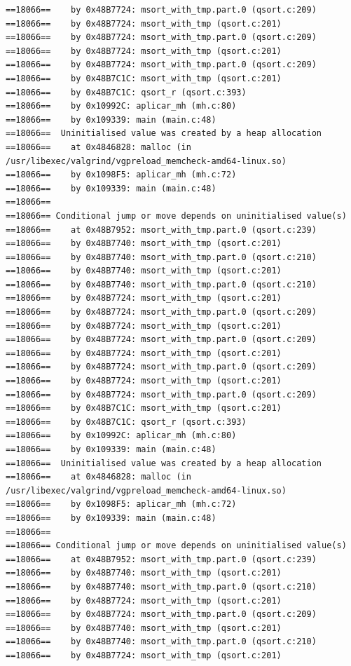 \documentclass[12pt]{article}
\begin{document}
\begin{lstlisting}[style=EstiloValgrind]
==18066==    by 0x48B7724: msort_with_tmp.part.0 (qsort.c:209)
==18066==    by 0x48B7724: msort_with_tmp (qsort.c:201)
==18066==    by 0x48B7724: msort_with_tmp.part.0 (qsort.c:209)
==18066==    by 0x48B7724: msort_with_tmp (qsort.c:201)
==18066==    by 0x48B7724: msort_with_tmp.part.0 (qsort.c:209)
==18066==    by 0x48B7C1C: msort_with_tmp (qsort.c:201)
==18066==    by 0x48B7C1C: qsort_r (qsort.c:393)
==18066==    by 0x10992C: aplicar_mh (mh.c:80)
==18066==    by 0x109339: main (main.c:48)
==18066==  Uninitialised value was created by a heap allocation
==18066==    at 0x4846828: malloc (in /usr/libexec/valgrind/vgpreload_memcheck-amd64-linux.so)
==18066==    by 0x1098F5: aplicar_mh (mh.c:72)
==18066==    by 0x109339: main (main.c:48)
==18066== 
==18066== Conditional jump or move depends on uninitialised value(s)
==18066==    at 0x48B7952: msort_with_tmp.part.0 (qsort.c:239)
==18066==    by 0x48B7740: msort_with_tmp (qsort.c:201)
==18066==    by 0x48B7740: msort_with_tmp.part.0 (qsort.c:210)
==18066==    by 0x48B7740: msort_with_tmp (qsort.c:201)
==18066==    by 0x48B7740: msort_with_tmp.part.0 (qsort.c:210)
==18066==    by 0x48B7724: msort_with_tmp (qsort.c:201)
==18066==    by 0x48B7724: msort_with_tmp.part.0 (qsort.c:209)
==18066==    by 0x48B7724: msort_with_tmp (qsort.c:201)
==18066==    by 0x48B7724: msort_with_tmp.part.0 (qsort.c:209)
==18066==    by 0x48B7724: msort_with_tmp (qsort.c:201)
==18066==    by 0x48B7724: msort_with_tmp.part.0 (qsort.c:209)
==18066==    by 0x48B7724: msort_with_tmp (qsort.c:201)
==18066==    by 0x48B7724: msort_with_tmp.part.0 (qsort.c:209)
==18066==    by 0x48B7C1C: msort_with_tmp (qsort.c:201)
==18066==    by 0x48B7C1C: qsort_r (qsort.c:393)
==18066==    by 0x10992C: aplicar_mh (mh.c:80)
==18066==    by 0x109339: main (main.c:48)
==18066==  Uninitialised value was created by a heap allocation
==18066==    at 0x4846828: malloc (in /usr/libexec/valgrind/vgpreload_memcheck-amd64-linux.so)
==18066==    by 0x1098F5: aplicar_mh (mh.c:72)
==18066==    by 0x109339: main (main.c:48)
==18066== 
==18066== Conditional jump or move depends on uninitialised value(s)
==18066==    at 0x48B7952: msort_with_tmp.part.0 (qsort.c:239)
==18066==    by 0x48B7740: msort_with_tmp (qsort.c:201)
==18066==    by 0x48B7740: msort_with_tmp.part.0 (qsort.c:210)
==18066==    by 0x48B7724: msort_with_tmp (qsort.c:201)
==18066==    by 0x48B7724: msort_with_tmp.part.0 (qsort.c:209)
==18066==    by 0x48B7740: msort_with_tmp (qsort.c:201)
==18066==    by 0x48B7740: msort_with_tmp.part.0 (qsort.c:210)
==18066==    by 0x48B7724: msort_with_tmp (qsort.c:201)

\end{lstlisting}
\end{document}

